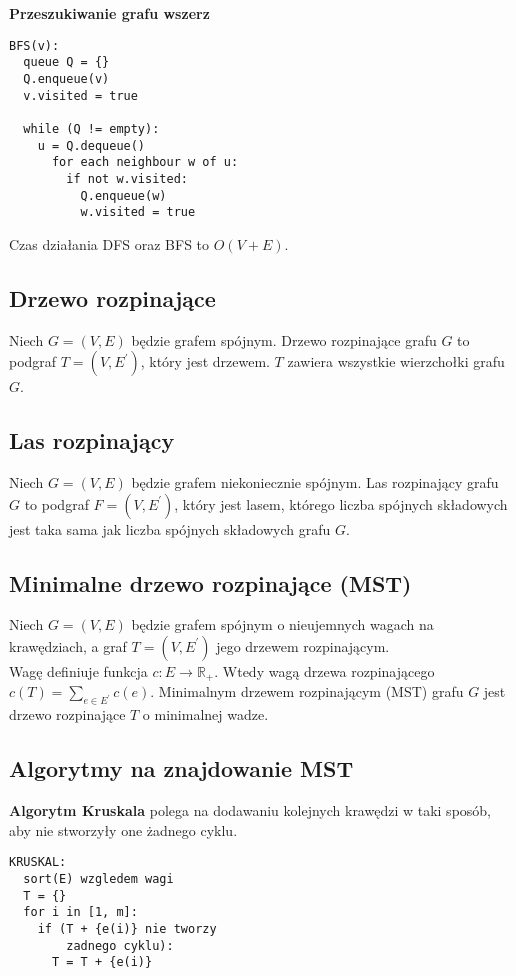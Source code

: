 \textbf{Przeszukiwanie grafu wszerz}
\begin{lstlisting}[style=code]
BFS(v):
  queue Q = {}
  Q.enqueue(v)
  v.visited = true
    
  while (Q != empty):
    u = Q.dequeue()
      for each neighbour w of u:
        if not w.visited:
          Q.enqueue(w)
          w.visited = true
\end{lstlisting}
Czas działania DFS oraz BFS to $O(V + E)$.

\subsection*{Drzewo rozpinające}
Niech $G = (V, E)$ będzie grafem spójnym. Drzewo rozpinające grafu $G$ to 
podgraf $T = (V, E^\prime)$, który jest drzewem. $T$ zawiera wszystkie
wierzchołki grafu $G$.

\subsection*{Las rozpinający}
Niech $G = (V, E)$ będzie grafem niekoniecznie spójnym. Las rozpinający
grafu $G$ to podgraf $F = (V, E^\prime)$, który jest lasem, którego liczba
spójnych składowych jest taka sama jak liczba spójnych składowych grafu $G$.

\subsection*{Minimalne drzewo rozpinające (MST)}
Niech $G = (V, E)$ będzie grafem spójnym o nieujemnych wagach na krawędziach, a
graf $T = (V, E^\prime)$ jego drzewem rozpinającym. \\
Wagę definiuje funkcja $c : E \to \mathbb{R}_+$. Wtedy wagą drzewa rozpinającego
$c(T) = \sum\limits_{e \in E^\prime} c(e)$. Minimalnym drzewem rozpinającym (MST)
grafu $G$ jest drzewo rozpinające $T$ o minimalnej wadze.

\subsection*{Algorytmy na znajdowanie MST}
\textbf{Algorytm Kruskala} polega na dodawaniu kolejnych krawędzi w taki sposób,
aby nie stworzyły one żadnego cyklu.
\begin{lstlisting}[style=code]
KRUSKAL:
  sort(E) wzgledem wagi
  T = {}
  for i in [1, m]:
    if (T + {e(i)} nie tworzy 
        zadnego cyklu):
      T = T + {e(i)}
\end{lstlisting}


